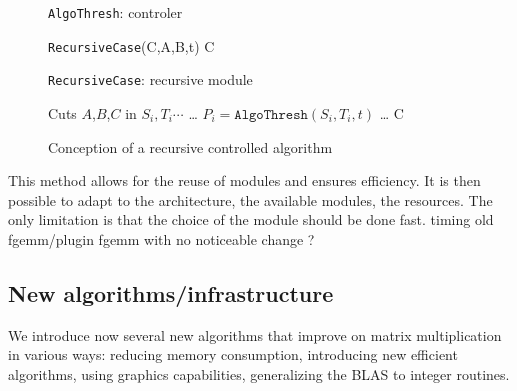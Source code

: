 \begin{figure}[htbp]
        \hfil
        \begin{minipage}{0.45\textwidth}
                \begin{algorithm}[H]
                        \caption{\texttt{AlgoThresh}: controler}
                        \label{alg:controle}
                        { {\tt RecursiveCase}(C,A,B,t)  }
                        \KwRet C \;
                \end{algorithm}
        \end{minipage}
        \hfil
        \begin{minipage}{0.45\textwidth}
                \begin{algorithm}[H]
                        \DontPrintSemicolon
                        \caption{\texttt{RecursiveCase}: recursive module}
                        \label{alg:action}
                        Cuts $A$,$B$,$C$ in $S_i, T_i\cdots$\;
                        \ldots \;
                        $P_i = \mathtt{AlgoThresh}(S_i,T_i,t)$ \;
                        \ldots \;
                        \KwRet C \;
                \end{algorithm}
        \end{minipage}
        \hfil
        \caption{Conception of a recursive controlled algorithm}
        \label{fig:seuil}
\end{figure}
%
This method allows for the reuse of modules and ensures efficiency.
It is then possible to adapt to the architecture, the available modules,
the resources. The only limitation is that the choice of the module
should be done fast.
%
%
\danger timing old fgemm/plugin fgemm with no noticeable change ?
%
\subsection{New algorithms/infrastructure}
%
We introduce now several new algorithms that improve on matrix multiplication
in various ways: reducing memory consumption, introducing new efficient
algorithms, using graphics capabilities, generalizing the BLAS to integer
routines.
%
